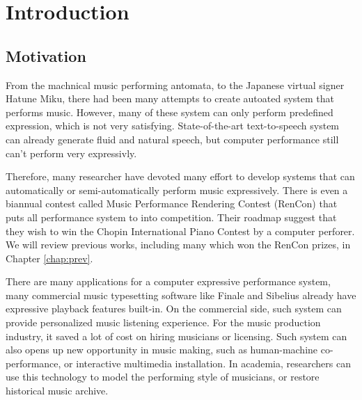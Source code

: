 \chapter{Introduction}
\section{Motivation}
From the machnical music performing antomata, to the Japanese virtual signer Hatune Miku, there had been many attempts to create autoated system that performs music. However, many of these system can only perform predefined expression, which is not very satisfying. State-of-the-art text-to-speech system can already generate fluid and natural speech, but computer performance still can't perform very expressivly.

Therefore, many researcher have devoted many effort to develop systems that can automatically or semi-automatically perform music expressively. There is even a biannual contest called Music Performance Rendering Contest (RenCon)\cite{rencon} that puts all performance system to into competition. Their roadmap suggest that they wish to win the Chopin International Piano Contest by a computer perforer. We will review previous works, including many which won the RenCon prizes, in Chapter \ref{chap:prev}.


There are many applications for a computer expressive performance system, many commercial music typesetting software like Finale and Sibelius already have expressive playback features built-in. On the commercial side, such system can provide personalized music listening experience. For the music production industry, it saved a lot of cost on hiring musicians or licensing. Such system can also opens up new opportunity in music making, such as human-machine co-performance, or interactive multimedia installation. In academia, researchers can use this technology to model the performing style of musicians, or restore historical music archive.

